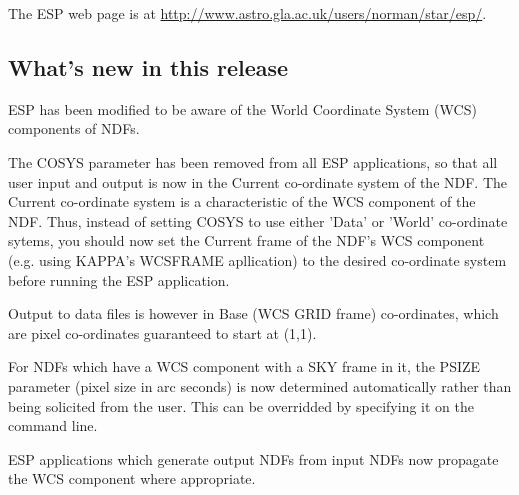 \documentclass[twoside,11pt]{starlink}
\begin{document}
The ESP web page is at
\url{http://www.astro.gla.ac.uk/users/norman/star/esp/}.

\subsection{What's new in this release}

ESP has been modified to be aware of the World Coordinate
System (WCS) components of NDFs.

The COSYS parameter has been removed from all ESP applications,
so that all user input and output is now in the Current
co-ordinate system of the NDF.  The Current co-ordinate system
is a characteristic of the WCS component of the NDF.
Thus, instead of setting COSYS to use either 'Data' or 'World'
co-ordinate sytems, you should now set the Current frame of the
NDF's WCS component (e.g. using KAPPA's WCSFRAME apllication)
to the desired co-ordinate system before running the ESP
application.

Output to data files is however in Base (WCS GRID frame)
co-ordinates, which are pixel co-ordinates guaranteed to start
at (1,1).

For NDFs which have a WCS component with a SKY frame in it, the
PSIZE parameter (pixel size in arc seconds) is now determined
automatically rather than being solicited from the user.
This can be overridded by specifying it on the command line.

ESP applications which generate output NDFs from input NDFs now
propagate the WCS component where appropriate.





%

%
%
\end{document}
